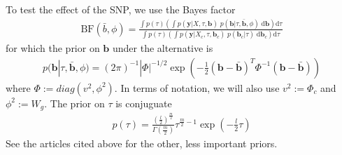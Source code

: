 \documentclass[10pt]{article}
\newcommand{\BF}{{\text{BF}}} %
\newcommand{\der}{{\text{d}}} %
\begin{document}
To test the effect of the SNP, we use the Bayes factor
\begin{equation}
  \begin{aligned}
    \BF(\bar{b},\phi) = \frac{\int p(\tau) \left( \int p(\bm{y}|X,\tau,\bm{b}) \; p(\bm{b}|\tau,\bm{\bar{b}},\phi) \; \der \bm{b} \right) \der \tau}{\int p(\tau) \left( \int p(\bm{y}|X_c,\tau,\bm{b}_c) \; p(\bm{b}_c|\tau) \; \der \bm{b}_c \right) \der \tau}
    \label{BF_init}
  \end{aligned}
\end{equation}
for which the prior on $\bm{b}$ under the alternative is
\begin{equation}
  \begin{aligned}
    p(\bm{b}|\tau,\bm{\bar{b}},\phi) = (2\pi)^{-1} |\Phi|^{-1/2} \exp \left( -\frac{1}{2} (\bm{b} - \bm{\bar{b}})^T \Phi^{-1} (\bm{b} - \bm{\bar{b}}) \right)
    \label{prior_b_alt}
  \end{aligned}
\end{equation}
where $\Phi := diag(v^2, \phi^2)$.
In terms of notation, we will also use $v^2 := \Phi_c$ and $\phi^2 := W_g$.
The prior on $\tau$ is conjuguate
\begin{equation}
  \begin{aligned}
    p(\tau) = \frac{(\frac{l}{2})^{\frac{m}{2}}}{\Gamma(\frac{m}{2})} \tau^{\frac{m}{2}-1} \exp \left( -\frac{l}{2}\tau \right)
    \label{prior_tau}
  \end{aligned}
\end{equation}
See the articles cited above for the other, less important priors.
\end{document}
